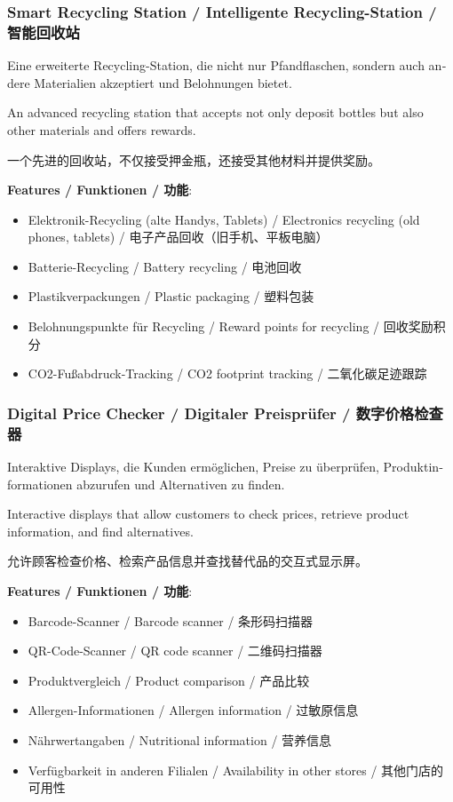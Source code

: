 \subsubsection{Smart Recycling Station / Intelligente Recycling-Station / 智能回收站}

\begin{otherlanguage}{ngerman}
Eine erweiterte Recycling-Station, die nicht nur Pfandflaschen, sondern auch andere Materialien akzeptiert und Belohnungen bietet.
\end{otherlanguage}

An advanced recycling station that accepts not only deposit bottles but also other materials and offers rewards.

一个先进的回收站，不仅接受押金瓶，还接受其他材料并提供奖励。

\textbf{Features / Funktionen / 功能}:
\begin{itemize}
    \item Elektronik-Recycling (alte Handys, Tablets) / Electronics recycling (old phones, tablets) / 电子产品回收（旧手机、平板电脑）
    \item Batterie-Recycling / Battery recycling / 电池回收
    \item Plastikverpackungen / Plastic packaging / 塑料包装
    \item Belohnungspunkte für Recycling / Reward points for recycling / 回收奖励积分
    \item CO2-Fußabdruck-Tracking / CO2 footprint tracking / 二氧化碳足迹跟踪
\end{itemize}

\subsubsection{Digital Price Checker / Digitaler Preisprüfer / 数字价格检查器}

\begin{otherlanguage}{ngerman}
Interaktive Displays, die Kunden ermöglichen, Preise zu überprüfen, Produktinformationen abzurufen und Alternativen zu finden.
\end{otherlanguage}

Interactive displays that allow customers to check prices, retrieve product information, and find alternatives.

允许顾客检查价格、检索产品信息并查找替代品的交互式显示屏。

\textbf{Features / Funktionen / 功能}:
\begin{itemize}
    \item Barcode-Scanner / Barcode scanner / 条形码扫描器
    \item QR-Code-Scanner / QR code scanner / 二维码扫描器
    \item Produktvergleich / Product comparison / 产品比较
    \item Allergen-Informationen / Allergen information / 过敏原信息
    \item Nährwertangaben / Nutritional information / 营养信息
    \item Verfügbarkeit in anderen Filialen / Availability in other stores / 其他门店的可用性
\end{itemize}

